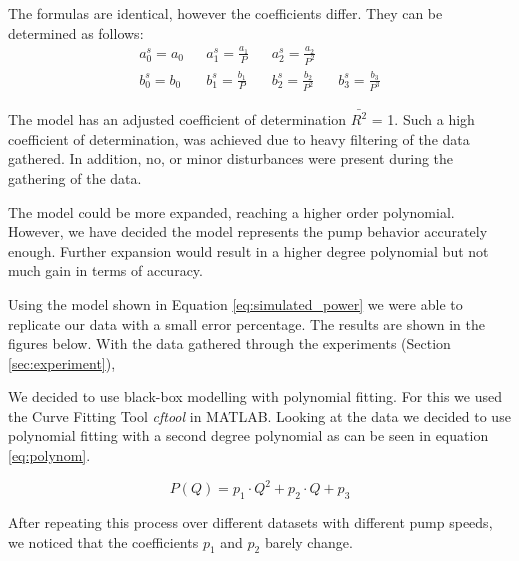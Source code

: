 The formulas are identical, however the coefficients differ. They can be determined as follows:
\begin{align*}
	a_0^s = a_0 && a_1^s = \frac{a_1}{P} && a_2^s = \frac{a_2}{P^2} \\
	b_0^s = b_0 && b_1^s = \frac{b_1}{P} && b_2^s = \frac{b_2}{P^2} && b_3^s = \frac{b_3}{P^3}
\end{align*}

\newpage
The model has an adjusted coefficient of determination  $\bar{R^2}$ = 1. Such a high coefficient of determination, was achieved due to
heavy filtering of the data gathered. In addition, no, or minor disturbances were present during the gathering of the data.

The model could be more expanded, reaching a higher order polynomial. However, we have decided the model represents the pump behavior 
accurately enough. Further expansion would result in a higher degree polynomial but not much gain in terms of accuracy.

Using the model shown in Equation \ref{eq:simulated_power} we were able to replicate our data with a small error percentage. The results
are shown in the figures below.
\newpage
With the data gathered through the experiments (Section \ref{sec:experiment}),

We decided to use black-box modelling with polynomial fitting.
For this we used the Curve Fitting Tool \cite{cftool} \textit{cftool} 
 in MATLAB.
Looking at the data we decided to use polynomial fitting with a second degree polynomial
as can be seen in equation \ref{eq:polynom}.

\begin{equation}
	 P(Q) = p_1 \cdot Q^2 + p_2 \cdot Q + p_3
	 \label{eq:polynom}
\end{equation}

After repeating this process over different datasets with different pump speeds,
we noticed that the coefficients $p_1$ and $p_2$ barely change.

